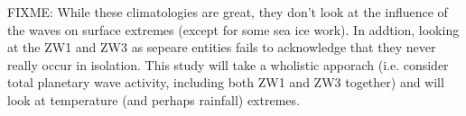 FIXME: While these climatologies are great, they don't look at the influence of the waves on surface extremes (except for some sea ice work). In addtion, looking at the ZW1 and ZW3 as sepeare entities fails to acknowledge that they never really occur in isolation. This study will take a wholistic apporach (i.e. consider total planetary wave activity, including both ZW1 and ZW3 together) and will look at temperature (and perhaps rainfall) extremes.

